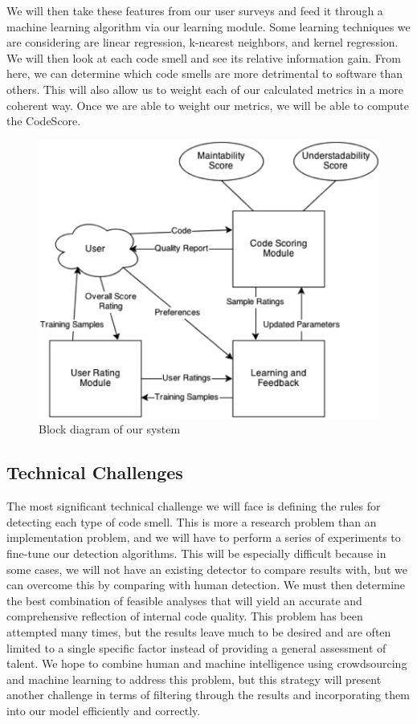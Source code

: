 \documentclass{sig-alternate}
\begin{document}
We will then take these features from our user surveys and feed it through a machine learning algorithm via our learning module. Some learning techniques we are considering are linear regression, k-nearest neighbors, and kernel regression. We will then look at each code smell and see its relative information gain. From here, we can determine which code smells are more detrimental to software than others. This will also allow us to weight each of our calculated metrics in a more coherent way. Once we are able to weight our metrics, we will be able to compute the CodeScore.

\begin{figure}[htb!]
	\begin{center}
		\includegraphics[width=0.9\linewidth]{block_diagram}
	\end{center}
	\vspace{-12pt}
	\caption{Block diagram of our system}
	\label{fig:some_graph}
\end{figure}

\subsection{Technical Challenges}
\label{subsec:tech_challenges}

The most significant technical challenge we will face is defining the rules for detecting each type of code smell. This is more a research problem than an implementation problem, and we will have to perform a series of experiments to fine-tune our detection algorithms. This will be especially difficult because in some cases, we will not have an existing detector to compare results with, but we can overcome this by comparing with human detection. We must then determine the best combination of feasible analyses that will yield an accurate and comprehensive reflection of internal code quality. This problem has been attempted many times, but the results leave much to be desired and are often limited to a single specific factor instead of providing a general assessment of talent. We hope to combine human and machine intelligence using crowdsourcing and machine learning to address this problem, but this strategy will present another challenge in terms of filtering through the results and incorporating them into our model efficiently and correctly.
\end{document}
